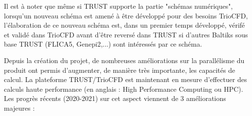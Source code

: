 \begin{center}\end{center}\smallskip

\newpage
Il est \`a noter que m\^eme si TRUST supporte la partie "sch\'emas num\'eriques", lorsqu'un nouveau sch\'ema est amen\'e \`a \^etre d\'evelopp\'e pour des besoins TrioCFD, l'\'elaboration de ce nouveau sch\'ema est, dans un premier temps d\'evelopp\'e, v\'erif\'e et valid\'e dans TrioCFD avant d'\^etre revers\'e dans TRUST si d'autres Baltiks sous base TRUST (FLICA5, Genepi2,...) sont int\'eress\'es par ce sch\'ema.

Depuis la cr\'eation du projet, de nombreuses améliorations sur la parallélisme du produit ont permis d'augmenter, de manière très importante, les capacités de calcul. La plateforme TRUST/TrioCFD est maintenant en mesure d'effectuer des calculs haute performance (en anglais : High Performance Computing ou HPC). Les progrès récents (2020-2021) sur cet aspect viennent de 3 améliorations majeures :
